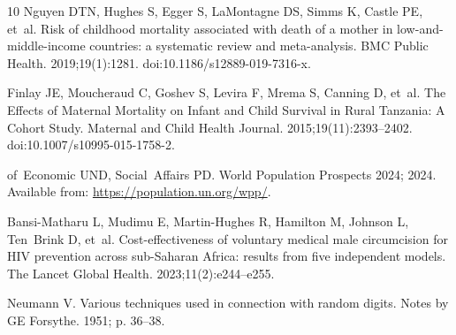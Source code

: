 \documentclass[10pt,letterpaper]{article}
\begin{document}
\begin{thebibliography}{10}
Nguyen DTN, Hughes S, Egger S, LaMontagne DS, Simms K, Castle PE, et~al.
\newblock Risk of childhood mortality associated with death of a mother in low-and-middle-income countries: a systematic review and meta-analysis.
\newblock BMC Public Health. 2019;19(1):1281.
\newblock doi:{10.1186/s12889-019-7316-x}.

Finlay JE, Moucheraud C, Goshev S, Levira F, Mrema S, Canning D, et~al.
\newblock The {Effects} of {Maternal} {Mortality} on {Infant} and {Child} {Survival} in {Rural} {Tanzania}: {A} {Cohort} {Study}.
\newblock Maternal and Child Health Journal. 2015;19(11):2393--2402.
\newblock doi:{10.1007/s10995-015-1758-2}.

of~Economic UND, Social~Affairs PD.
\newblock World Population Prospects 2024; 2024.
\newblock Available from: \url{https://population.un.org/wpp/}.

Bansi-Matharu L, Mudimu E, Martin-Hughes R, Hamilton M, Johnson L, Ten~Brink D, et~al.
\newblock Cost-effectiveness of voluntary medical male circumcision for HIV prevention across sub-Saharan Africa: results from five independent models.
\newblock The Lancet Global Health. 2023;11(2):e244--e255.

Neumann V.
\newblock Various techniques used in connection with random digits.
\newblock Notes by GE Forsythe. 1951; p. 36--38.

\end{thebibliography}
\end{document}
